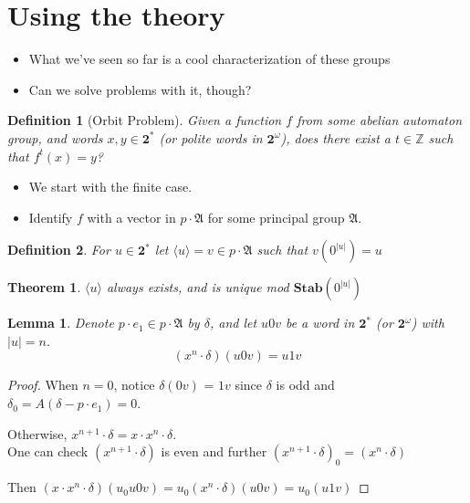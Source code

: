 \documentclass{beamer}
\newtheorem{thm}{Theorem}
\newtheorem{lem}{Lemma}
\newtheorem{defn}{Definition}
\newcommand{\2}{\textbf{2}}
\newcommand{\Z}{\mathbb{Z}}
\newcommand{\p}{\mathfrak{A}}
\begin{document}
\section{Using the theory}
\begin{frame}
  \begin{itemize}
    \item What we've seen so far is a cool characterization of these groups
    \item Can we solve problems with it, though?
  \end{itemize}

  \begin{defn}[Orbit Problem]
    Given a function $f$ from some abelian automaton group, and
    words $x, y \in \2^*$ (or polite words in $\2^\omega$), 
    does there exist a $t \in \Z$ such that $f^t(x) = y$?
  \end{defn}
\end{frame}

\begin{frame}
  \begin{itemize}
    \item We start with the finite case.
    \item Identify $f$ with a vector in $p \cdot \p$ for some
          principal group $\p$.
  \end{itemize}

  \begin{defn}
    For $u \in \2^*$ let $\langle u \rangle = v \in p \cdot \p$ such that
    $v(0^{|u|}) = u$
  \end{defn}
\end{frame}

\begin{frame}
  \begin{thm}
    $\langle u \rangle$ always exists, and is unique mod 
    $\textbf{Stab}(0^{|u|})$
  \end{thm}

  \begin{lem}
    Denote $p \cdot e_1 \in p \cdot \p$ by $\delta$, and 
    let $u0v$ be a word in $\2^*$ (or $\2^\omega$) with $|u| = n$.
    \[
      (x^{n} \cdot \delta)(u0v) = u1v
    \]
  \end{lem}

  \begin{proof}
    When $n = 0$, notice $\delta(0v)$ = $1v$ since $\delta$ is odd and
    $\delta_0 = A(\delta - p \cdot e_1) = 0$.

    \bigskip

    Otherwise, $x^{n+1} \cdot \delta = x \cdot x^{n} \cdot \delta$.\\
    One can check $(x^{n+1} \cdot \delta)$ is even and further
    $(x^{n+1} \cdot \delta)_0 = (x^{n} \cdot \delta)$
    
    \bigskip

    Then $(x \cdot x^{n} \cdot \delta)(u_0u0v) = u_0 (x^{n} \cdot \delta)(u0v) = u_0(u1v)$
  \end{proof}
\end{frame}
\end{document}
